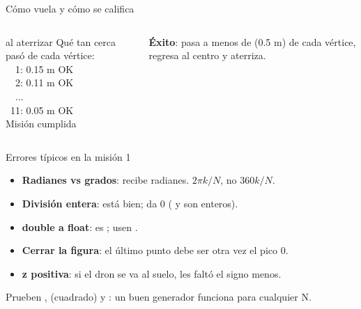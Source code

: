 \begin{frame}{Cómo vuela y cómo se califica}
  \begin{columns}[c]
    \begin{terminal}{al aterrizar}
Qué tan cerca pasó de cada vértice:\\
\ \ 1: 0.15 m OK\\
\ \ 2: 0.11 m OK\\
\ \ ...\\
\ 11: 0.05 m OK\\
Misión cumplida
    \end{terminal}
    \small\textbf{Éxito}: pasa a menos de  (0.5 m) de cada vértice, regresa al centro y aterriza.
  \end{columns}
\end{frame}

\begin{frame}{Errores típicos en la misión 1}
  \begin{itemize}\small
    \item \textbf{Radianes vs grados}:  recibe radianes. $2\pi k/N$, no $360k/N$.
    \item \textbf{División entera}:  está bien;  da 0
      ( y  son enteros).
    \item \textbf{double a float}:  es ; usen .
    \item \textbf{Cerrar la figura}: el último punto debe ser otra vez el pico 0.
    \item \textbf{z positiva}: si el dron se va al suelo, les faltó el signo menos.
  \end{itemize}
  \begin{idea}
    \small Prueben ,  (cuadrado) y :
    un buen generador funciona para cualquier N.
  \end{idea}
\end{frame}

